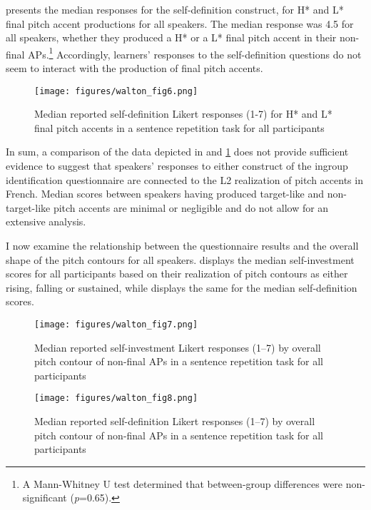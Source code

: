 \documentclass[output=paper,colorlinks,citecolor=brown,draftmode]{langscibook}
\begin{document}
 presents the median responses for the self-definition construct, for H* and L* final pitch accent productions for all speakers. The median response was 4.5 for all speakers, whether they produced a H* or a L* final pitch accent in their non-final APs.\footnote{A Mann-Whitney U test determined that between-group differences were non-significant (\textit{p}=0.65).} Accordingly, learners’ responses to the self-definition questions do not seem to interact with the production of final pitch accents.

\begin{figure}
    \texttt{[image: figures/walton\_fig6.png]}
    \caption{Median reported self-definition Likert responses (1-7) for H* and L* final pitch accents in a sentence repetition task for all participants}
    \label{SD.Pitch Accent}
\end{figure}

In sum, a comparison of the data depicted in  and \ref{SD.Pitch Accent} does not provide sufficient evidence to suggest that speakers’ responses to either construct of the ingroup identification questionnaire are connected to the L2 realization of pitch accents in French. Median scores between speakers having produced target-like and non-target-like pitch accents are minimal or negligible and do not allow for an extensive analysis.


I now examine the relationship between the questionnaire results and the overall shape of the pitch contours for all speakers.  displays the median self-investment scores for all participants based on their realization of pitch contours as either rising, falling or sustained, while  displays the same for the median self-definition scores.

\begin{figure}
    \texttt{[image: figures/walton\_fig7.png]}
    \caption{Median reported self-investment Likert responses (1--7) by overall pitch contour of non-final APs in a sentence repetition task for all participants}
    \label{SI.Pitch Contour}
\end{figure}

\begin{figure}
    \texttt{[image: figures/walton\_fig8.png]}
    \caption{Median reported self-definition Likert responses (1--7) by overall pitch contour of non-final APs in a sentence repetition task for all participants}
    \label{SD.Pitch Contour}
\end{figure}
\end{document}
